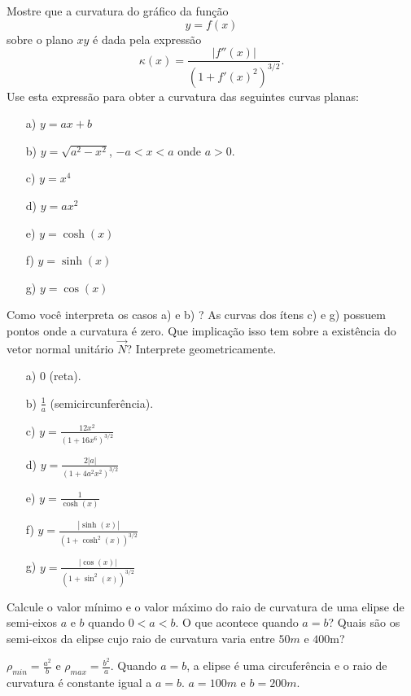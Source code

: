\begin{exer} Mostre que a curvatura do gráfico da função
$$y=f(x)$$
sobre o plano $xy$
é dada pela expressão
$$\kappa(x)=\frac{|f''(x)|}{\left(1+f'(x)^2\right)^{3/2}}.$$
Use esta expressão para obter a curvatura das seguintes curvas planas:
\begin{itemize}
\item[a)] $y=ax+b$
\item[b)]$y=\sqrt{a^2-x^2}$, $-a<x<a$ onde $a>0$.
\item[c)] $y=x^4$
\item[d)] $y=ax^2$ 
\item[e)] $y=\cosh(x)$
\item[f)] $y=\sinh(x)$
\item[g)] $y=\cos(x)$
\end{itemize}
Como você interpreta os casos a) e b) ? As curvas dos ítens c) e g) possuem pontos onde a curvatura é zero. Que implicação isso tem sobre a existência do vetor normal unitário $\vec{N}$? Interprete geometricamente.
\end{exer}
\begin{resp}
\begin{itemize}
\item[a)] $0$ (reta).
\item[b)]$\frac{1}{a}$ (semicircunferência).
\item[c)] $y=\frac{12x^2}{(1+16x^6)^{3/2}}$
\item[d)] $y=\frac{2|a|}{(1+4a^2x^2)^{3/2}}$
\item[e)] $y=\frac{1}{\cosh(x)}$
\item[f)] $y=\frac{|\sinh(x)|}{(1+\cosh^2(x))^{3/2}}$
\item[g)] $y=\frac{|\cos(x)|}{(1+\sin^2(x))^{3/2}}$
\end{itemize}
 \end{resp}

\begin{exer}
 Calcule o valor mínimo e o valor máximo do raio de curvatura de uma elipse de semi-eixos $a$ e $b$ quando $0<a<b$. O que acontece quando $a=b$? Quais são os semi-eixos da elipse cujo raio de curvatura varia entre $50m$ e $400$m?
\end{exer}
\begin{resp}
 $\rho_{min}= \frac{a^2}{b}$ e $\rho_{max}= \frac{b^2}{a}$. Quando $a=b$, a elipse é uma circuferência e o raio de curvatura é constante igual a $a=b$. $a=100m$ e $b=200m$. 
\end{resp}

